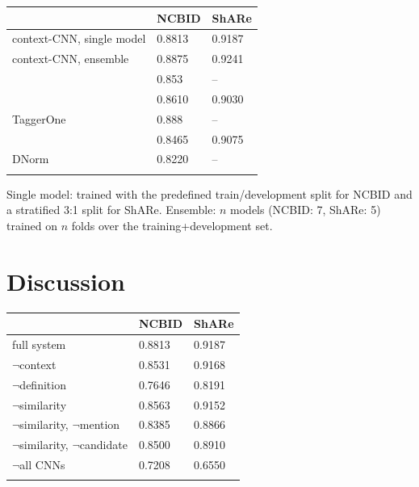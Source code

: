 \documentclass{bioinfo}
\begin{document}
\begin{table}[!t]
{\begin{tabular}{@{}lll@{}}\toprule
                                   & NCBID  & ShARe \\\midrule
  context-CNN, single model        & 0.8813 & 0.9187 \\
  context-CNN, ensemble            & 0.8875 & 0.9241 \\
  \cite{liu-xu:2018:NLPCC}         & 0.853  & -- \\
  \cite{lihaodi-et-al:2017}        & 0.8610 & 0.9030 \\
  TaggerOne                        & 0.888  & -- \\
  \cite{dsouza-ng:2015:ACL-IJCNLP} & 0.8465 & 0.9075 \\
  DNorm                            & 0.8220 & -- \\\botrule
\end{tabular}}{Single model: trained with the predefined train/development split for NCBID and a stratified 3:1 split for ShARe. Ensemble: $n$ models (NCBID: 7, ShARe: 5) trained on $n$ folds over the training+development set.}
\end{table}



\section{Discussion}

\begin{table}[!t]
{\begin{tabular}{@{}lll@{}}\toprule
                                    & NCBID  & ShARe \\
  \midrule
  full system                       & 0.8813 & 0.9187 \\
  \midrule
  $\neg$context                     & 0.8531 & 0.9168 \\
  $\neg$definition                  & 0.7646 & 0.8191 \\
  \midrule
  $\neg$similarity                  & 0.8563 & 0.9152 \\
  $\neg$similarity, $\neg$mention   & 0.8385 & 0.8866 \\
  $\neg$similarity, $\neg$candidate & 0.8500 & 0.8910 \\
  \midrule
  $\neg$all CNNs                    & 0.7208 & 0.6550 \\
  \botrule
\end{tabular}}{}
\end{table}
\end{document}
